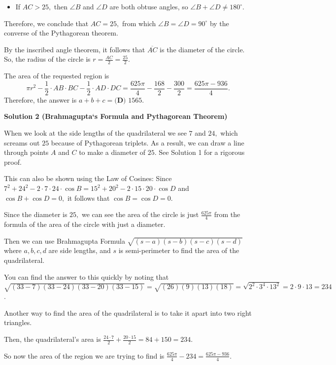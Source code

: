 \begin{enumerate}
            \begin{itemize}
        \item If $AC>25,$ then $\angle B$ and $\angle D$ are both obtuse angles, so $\angle B + \angle D \neq 180^{\circ}.$
            \end{itemize}
            Therefore, we conclude that $AC=25,$ from which $\angle B = \angle D = 90^{\circ}$ by the converse of the Pythagorean theorem.

 By the inscribed angle theorem, it follows that $\overline{AC}$ is the diameter of the circle. So, the radius of the circle is $r=\frac{AC}{2}=\frac{25}{2}.$

 The area of the requested region is 
 \[\pi r^2 - \frac12\cdot AB\cdot BC - \frac12\cdot AD\cdot DC = \frac{625\pi}{4}-\frac{168}{2}-\frac{300}{2}=\frac{625\pi-936}{4}.\]Therefore, the answer is $a+b+c=\boxed{\textbf{(D) } 1565}.$




\textbf{Solution 2 (Brahmagupta‘s Formula and Pythagorean Theorem)}

When we look at the side lengths of the quadrilateral we see $7$ and $24,$ which screams out $25$ because of Pythagorean triplets. As a result, we can draw a line through points $A$ and $C$ to make a diameter of $25.$ See Solution 1 for a rigorous proof.

 This can also be shown using the Law of Cosines: Since $7^2+24^2-2\cdot7\cdot24\cdot\cos B=15^2+20^2-2\cdot15\cdot20\cdot\cos D$ and $\cos B + \cos D = 0,$ it follows that $\cos B = \cos D = 0.$

 Since the diameter is $25,$ we can see the area of the circle is just $\frac{625\pi}{4}$ from the formula of the area of the circle with just a diameter. 

 Then we can use Brahmagupta Formula $\sqrt{(s - a)(s - b)(s - c)(s - d)}$ where $a,b,c,d$ are side lengths, and $s$ is semi-perimeter to find the area of the quadrilateral. 

 You can find the answer to this quickly by noting that $\sqrt{(33-7)(33-24)(33-20)(33-15)} = \sqrt{(26)(9)(13)(18)} = \sqrt{2^2 \cdot 3^4 \cdot 13^2} = 2 \cdot 9 \cdot 13 = 234$. 

 Another way to find the area of the quadrilateral is to take it apart into two right triangles.

 Then, the quadrilateral's area is $\frac{24\cdot7}{2}+\frac{20\cdot15}{2}=84+150=234.$

 So now the area of the region we are trying to find is $\frac{625\pi}{4} - 234 = \frac{625\pi-936}{4}.$


\end{enumerate}
